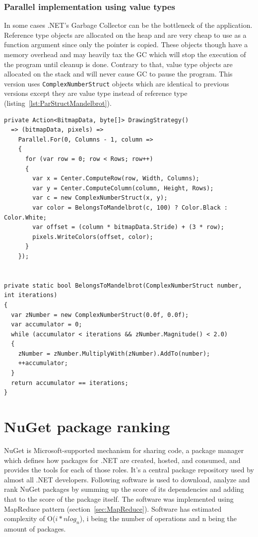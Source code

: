 \subsubsection{Parallel implementation using value types}

In some cases .NET's Garbage Collector can be the bottleneck of the application. Reference type objects are allocated on the heap and are very cheap to use as a function argument since only the pointer is copied. These objects though have a memory overhead and may heavily tax the GC which will stop the execution of the program until cleanup is done. Contrary to that, value type objects are allocated on the stack and will never cause GC to pause the program. This version uses \texttt{ComplexNumberStruct} objects which are identical to previous versions except they are value type instead of reference type (listing~\ref{lst:ParStructMandelbrot}).

\begin{lstlisting}[style=sharpcstyle, caption={Parallel Mandelbrot algorithm using value types}, label={lst:ParStructMandelbrot},
numbers=none, xleftmargin=0pt,framexleftmargin=0pt,framexrightmargin=0pt,framexbottommargin=0pt]
private Action<BitmapData, byte[]> DrawingStrategy()
  => (bitmapData, pixels) =>
    Parallel.For(0, Columns - 1, column =>
    {
      for (var row = 0; row < Rows; row++)
      {
        var x = Center.ComputeRow(row, Width, Columns);
        var y = Center.ComputeColumn(column, Height, Rows);
        var c = new ComplexNumberStruct(x, y);
        var color = BelongsToMandelbrot(c, 100) ? Color.Black : Color.White;
        var offset = (column * bitmapData.Stride) + (3 * row);
        pixels.WriteColors(offset, color);
      }
    });


private static bool BelongsToMandelbrot(ComplexNumberStruct number, int iterations)
{
  var zNumber = new ComplexNumberStruct(0.0f, 0.0f);
  var accumulator = 0;
  while (accumulator < iterations && zNumber.Magnitude() < 2.0)
  {
    zNumber = zNumber.MultiplyWith(zNumber).AddTo(number);
    ++accumulator;
  }
  return accumulator == iterations;
}

\end{lstlisting}


\section{NuGet package ranking} 
\label{sec: NuGetImp}
NuGet is Microsoft-supported mechanism for sharing code, a package manager which defines how packages for .NET are created, hosted, and consumed, and provides the tools for each of those roles. It's a central package repository used by almost all .NET developers. Following software is used to download, analyze and rank NuGet packages by summing up the score of its dependencies and adding that to the score of the package itself. The software was implemented using MapReduce pattern (section~\ref{sec:MapReduce}). Software has estimated complexity of O($i*nlog_n$), i being the number of operations and n being the amount of packages. 

